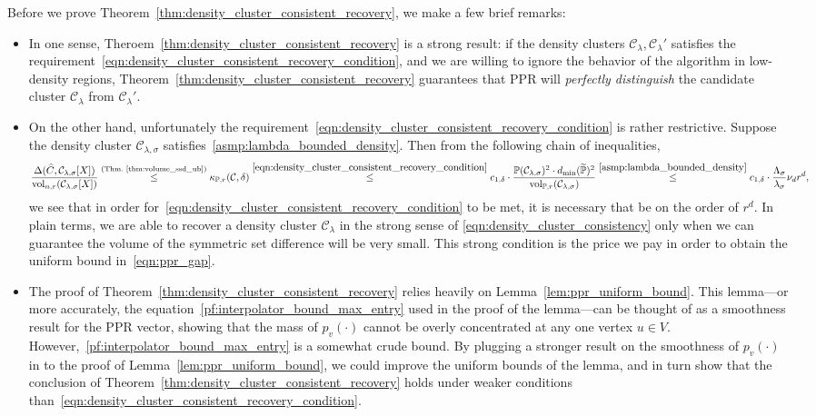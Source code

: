 \documentclass[twoside,11pt]{article}
\newcommand{\1}{\mathbf{1}}
\newcommand{\mc}[1]{\mathcal{#1}}
\newcommand{\Pbb}{\mathbb{P}}
\newcommand{\wt}[1]{\widetilde{#1}}
\newcommand{\wh}[1]{\widehat{#1}}
\newcommand{\vol}{\mathrm{vol}}
\begin{document}
Before we prove Theorem~\ref{thm:density_cluster_consistent_recovery}, we make a few brief remarks:
\begin{itemize}
	\item In one sense, Theroem~\ref{thm:density_cluster_consistent_recovery} is a strong result: if the density clusters $\mc{C}_{\lambda},\mc{C}_{\lambda}'$ satisfies the requirement~\eqref{eqn:density_cluster_consistent_recovery_condition}, and we are willing to ignore the behavior of the algorithm in low-density regions, Theorem~\ref{thm:density_cluster_consistent_recovery} guarantees that PPR will \emph{perfectly distinguish} the candidate cluster $\mc{C}_{\lambda}$ from $\mc{C}_{\lambda}'$.
	
	\item On the other hand, unfortunately the requirement~\eqref{eqn:density_cluster_consistent_recovery_condition} is rather restrictive. Suppose the density cluster $\mc{C}_{\lambda,\sigma}$ satisfies~\ref{asmp:lambda_bounded_density}. Then from the following chain of inequalities,
	\begin{equation*}
	\frac{\Delta(\wh{C}, \mc{C}_{\lambda,\sigma}[X])}{\vol_{n,r}(\mc{C}_{\lambda,\sigma}[X])} \overset{(\textrm{Thm.~\ref{thm:volume_ssd_ub}})}{\leq} \kappa_{\Pbb,r}(\mc{C},\delta) \overset{\eqref{eqn:density_cluster_consistent_recovery_condition}}{\leq} c_{1,\delta} \cdot \frac{\Pbb(\mc{C}_{\lambda,\sigma})^2 \cdot d_{\min}(\wt{\Pbb})^2}{\vol_{\Pbb,r}(\mc{C}_{\lambda,\sigma})} \overset{\ref{asmp:lambda_bounded_density}}{\leq} c_{1,\delta} \cdot \frac{\Lambda_{\sigma}}{\lambda_{\sigma}} \nu_d r^d,
	\end{equation*}
	we see that in order for~\eqref{eqn:density_cluster_consistent_recovery_condition} to be met, it is necessary that \smash{$\Delta(\wh{C}, \mc{C}_{\lambda,\sigma}[X])/\vol_{n,r}(\mc{C}_{\lambda,\sigma}[X])$} be on the order of $r^d$. In plain terms, we 
	are able to recover a density cluster $\mc{C}_{\lambda}$ in the strong sense of
	\eqref{eqn:density_cluster_consistency} only when we can guarantee the volume of the symmetric set difference will be very small. This strong condition is
	the price we pay in order to obtain the uniform bound in~\eqref{eqn:ppr_gap}. 
	\item The proof of Theorem~\ref{thm:density_cluster_consistent_recovery} relies heavily on Lemma~\ref{lem:ppr_uniform_bound}. This lemma---or more accurately, the equation~\eqref{pf:interpolator_bound_max_entry} used in the proof of the lemma---can be thought of as a smoothness result for the PPR vector, showing that the mass of $p_v(\cdot)$ cannot be overly concentrated at any one vertex $u \in V$. However,~\eqref{pf:interpolator_bound_max_entry} is a somewhat crude bound. By plugging a stronger result on the smoothness of $p_v(\cdot)$ in to the proof of Lemma~\ref{lem:ppr_uniform_bound}, we could improve the uniform bounds of the lemma, and in turn show that the conclusion of Theorem~\ref{thm:density_cluster_consistent_recovery} holds under weaker conditions than~\eqref{eqn:density_cluster_consistent_recovery_condition}. 
\end{itemize}  
\end{document}
